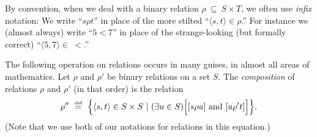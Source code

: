 By convention, when we deal with a binary relation $\rho \ \subseteq \ S \times T$, we often use {\em infix} notation: We write ``$s \rho t$'' in place of the more stilted ``$\langle s, t \rangle \in \rho$.''  For instance we (almost always) write ``$5 < 7$'' in place of the strange-looking (but formally correct) ``$\langle 5,7 \rangle \in \ <$.''

\medskip


The following operation on relations occurs in many guises, in almost all areas of mathematics.  Let $\rho$ and $\rho'$ be binary relations on a set $S$.  The {\it composition} of relations $\rho$ and $\rho'$ (in that order) is the relation
\[ 
\rho'' \ \eqdef \ \Bigl\{ \langle s, t \rangle \in S \times S \ | \
(\exists u \in S) \Bigl[ [s \rho u] \mbox{ and } [u \rho' t] \Bigr] \Bigr\}.
\]
(Note that we use both of our notations for relations in this equation.) 

\bigskip

\noindent {}
\bigskip

